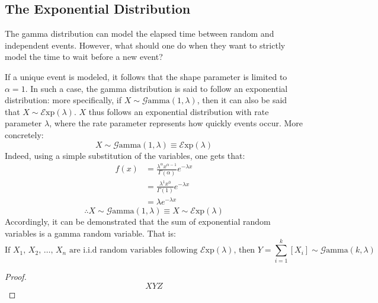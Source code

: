 \documentclass[12pt]{article}
\newcommand{\E}{\mathcal{E}}
\newcommand{\G}{\mathcal{G}}
\begin{document}
\pagebreak
\subsection{The Exponential Distribution}
The gamma distribution can model the elapsed time between random and independent events. However, what should one do
when they want to strictly model the time to wait before a new event?

If a unique event is modeled, it follows that the shape parameter is limited to $\alpha = 1$. In such a case, the gamma
distribution is said to follow an exponential distribution: more specifically, if $X\sim\G\text{amma}(1, \lambda)$, then
it can also be said that $X\sim\E\text{xp}(\lambda)$. $X$ thus follows an exponential distribution with rate parameter
$\lambda$, where the rate parameter represents how quickly events occur. More concretely:
\begin{equation}
	X\sim\G\text{amma}(1, \lambda)\equiv\E\text{xp}(\lambda)
\end{equation}
Indeed, using a simple substitution of the variables, one gets that:
\begin{equation}\label{eq:relation:exp}
	\begin{split}
		f(x)	&=	\frac{\lambda^\alpha x^{\alpha-1}}{\Gamma(\alpha)}e^{-\lambda x}\\
				&=	\frac{\lambda^1 x^{0}}{\Gamma(1)}e^{-\lambda x}\\
				&=	\lambda e^{-\lambda x}
	\end{split}
\end{equation}
\begin{equation}
	\therefore X\sim\G\text{amma}(1, \lambda)\equiv X\sim\E\text{xp}(\lambda)
\end{equation}
Accordingly, it can be demonstrated that the sum of exponential random variables is a gamma random variable. That is:
\begin{equation}
	\text{If } X_1,\,X_2,\,\ldots,\,X_n \text{ are i.i.d random variables following } \E\text{xp}(\lambda)\text{, then }Y=\sum^k_{i=1}\left[X_i\right]\sim\G\text{amma}(k, \lambda)
\end{equation}
\begin{proof}
	\begin{equation}
		XYZ
	\end{equation}
\end{proof}
\end{document}
